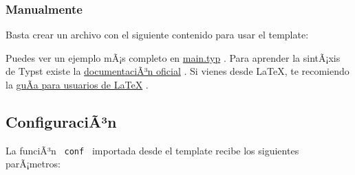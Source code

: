 \subsubsection{Manualmente}\label{manualmente}

Basta crear un archivo con el siguiente contenido para usar el template:

\begin{Shaded}
\begin{Highlighting}[]

\NormalTok{  ),}
\NormalTok{)}

\end{Highlighting}
\end{Shaded}

Puedes ver un ejemplo mÃ¡s completo en
\href{https://github.com/typst/packages/raw/main/packages/preview/enunciado-facil-fcfm/0.1.0/template/main.typ}{main.typ}
. Para aprender la sintÃ¡xis de Typst existe la
\href{https://typst.app/docs}{documentaciÃ³n oficial} . Si vienes desde
LaTeX, te recomiendo la
\href{https://typst.app/docs/guides/guide-for-latex-users/}{guÃ­a para
usuarios de LaTeX} .

\subsection{ConfiguraciÃ³n}\label{configuraciuxe3uxb3n}

La funciÃ³n \texttt{\ conf\ } importada desde el template recibe los
siguientes parÃ¡metros:

